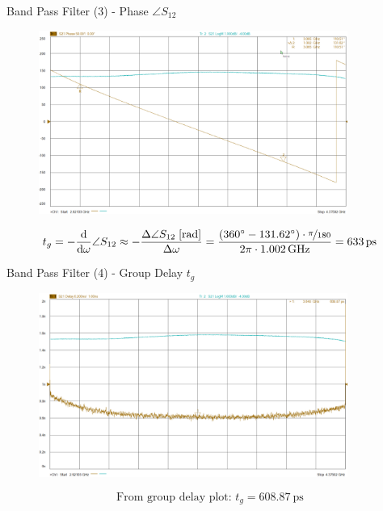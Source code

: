 \documentclass{beamer}
\begin{document}
\begin{frame}[t,fragile]{Band Pass Filter (3) - Phase $\angle S_{12}$}
\begin{figure}
  \centering
  \includegraphics[width=0.9\textwidth]{img/bandpass_phase.png}
\end{figure}
\begin{equation*}
t_g = - \frac{\text{d}}{\text{d}\omega} \angle S_{12} \approx -\frac{\Delta \angle S_{12} \;[\si{\radian}]}{\Delta \omega} = \frac{(\SI{360}{\degree}-\SI{131.62}{\degree})\cdot \nicefrac{\pi}{180}}{2\pi\cdot\SI{1.002}{\GHz}} = \SI{633}{\pico\second}
\end{equation*}
\end{frame}

\begin{frame}[t,fragile]{Band Pass Filter (4) - Group Delay $t_g$}
\begin{figure}
  \centering
  \includegraphics[width=0.9\textwidth]{img/bandpass_groupdelay.png}
\end{figure}
\begin{equation*}
\text{From group delay plot: }t_g = \SI{608.87}{\pico\second}
\end{equation*}
\end{frame}
\end{document}
